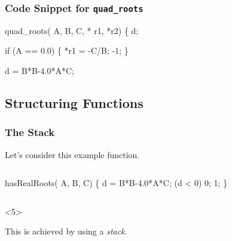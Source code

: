 \documentclass[smaller,table]{beamer} %
\begin{document}
\begin{frame}[fragile]
\frametitle{Code Snippet for {\tt quad\_roots}}
\begin{semiverbatim}
 quad\_roots( A,  B,  C,
                * r1,  *r2)
\{
    d;
   
   if (A == 0.0)
   \{
      *r1 = -C/B;
       -1;
   \}
          
   d = B*B-4.0*A*C;
\end{semiverbatim}
\end{frame}

\subsection{Structuring Functions}
\begin{frame}[fragile]
\frametitle{The Stack}
Let's consider this example function.
\begin{columns}
\begin{column}{5cm}
\begin{semiverbatim}
 hasRealRoots(\alert<2>{ A},
       \alert<2>{ B,  C})
\{
   \alert<3>{ d} = B*B-4.0*A*C;
    (d < 0) \alert<4>{} 0;
   \alert<4>{} 1;
\}
\end{semiverbatim}
\end{column}
\begin{column}{5cm}
\end{column}
\end{columns}
\vspace{0.1in}
\begin{block}<5>{}
\begin{center}
\alert<5>{This is achieved by using a \emph{stack}.}
\end{center}
\end{block}
\end{frame}
\end{document}
